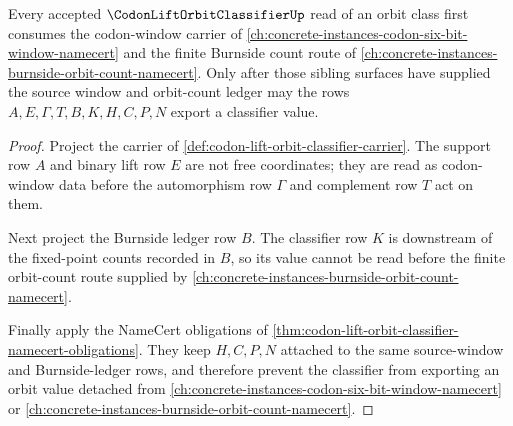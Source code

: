 \begin{theorem}
\label{thm:codon-lift-orbit-classifier-codon-window-dependency}
Every accepted $\CodonLiftOrbitClassifierUp$ read of an orbit class first consumes the codon-window carrier of \autoref{ch:concrete-instances-codon-six-bit-window-namecert} and the finite Burnside count route of \autoref{ch:concrete-instances-burnside-orbit-count-namecert}. Only after those sibling surfaces have supplied the source window and orbit-count ledger may the rows $A,E,\Gamma,T,B,K,H,C,P,N$ export a classifier value.
\end{theorem}
\begin{proof}
Project the carrier of \autoref{def:codon-lift-orbit-classifier-carrier}. The support row $A$ and binary lift row $E$ are not free coordinates; they are read as codon-window data before the automorphism row $\Gamma$ and complement row $T$ act on them.

Next project the Burnside ledger row $B$. The classifier row $K$ is downstream of the fixed-point counts recorded in $B$, so its value cannot be read before the finite orbit-count route supplied by \autoref{ch:concrete-instances-burnside-orbit-count-namecert}.

Finally apply the NameCert obligations of \autoref{thm:codon-lift-orbit-classifier-namecert-obligations}. They keep $H,C,P,N$ attached to the same source-window and Burnside-ledger rows, and therefore prevent the classifier from exporting an orbit value detached from \autoref{ch:concrete-instances-codon-six-bit-window-namecert} or \autoref{ch:concrete-instances-burnside-orbit-count-namecert}.
\end{proof}




